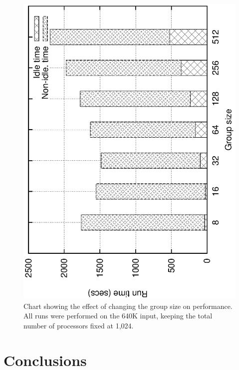 \documentclass[10pt,journal,letterpaper,compsoc]{IEEEtran}
\begin{document}
\begin{figure}[tb]
\centerline{
						\includegraphics[angle=-90, scale=0.5]{groupSize.eps}
}
\caption{
Chart showing the effect of changing the group size on performance. All runs were performed on the 640K input, keeping the total number of processors fixed at 1,024. 
}
\label{figGroupStudy}
\end{figure}



\section{Conclusions}
\label{secConclusions}
\end{document}
